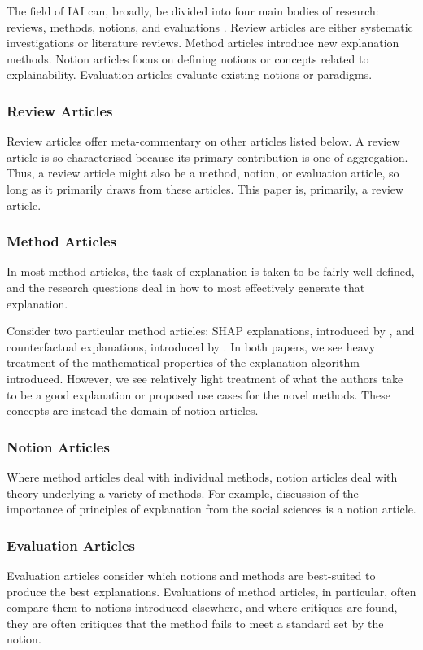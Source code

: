 The field of IAI can, broadly, be divided into four main bodies of research: reviews, methods, notions, and evaluations \cite{vilone_explainable_2020}. Review articles are either systematic investigations or literature reviews. Method articles introduce new explanation methods. Notion articles focus on defining notions or concepts related to explainability. Evaluation articles evaluate existing notions or paradigms.

\subsubsection{Review Articles}
Review articles offer meta-commentary on other articles listed below. A review article is so-characterised because its primary contribution is one of aggregation. Thus, a review article might also be a method, notion, or evaluation article, so long as it primarily draws from these articles. This paper is, primarily, a review article.

\subsubsection{Method Articles}
In most method articles, the task of explanation is taken to be fairly well-defined, and the research questions deal in how to most effectively generate that explanation. 

Consider two particular method articles: SHAP explanations, introduced by \textcite{lundberg_unified_2017}, and counterfactual explanations, introduced by \textcite{wachter_counterfactual_2017}. In both papers, we see heavy treatment of the mathematical properties of the explanation algorithm introduced. However, we see relatively light treatment of what the authors take to be a good explanation or proposed use cases for the novel methods. These concepts are instead the domain of notion articles.

\subsubsection{Notion Articles}
Where method articles deal with individual methods, notion articles deal with theory underlying a variety of methods. For example, \textcite{miller_explanation_2017} discussion of the importance of principles of explanation from the social sciences is a notion article.

\subsubsection{Evaluation Articles}
Evaluation articles consider which notions and methods are best-suited to produce the best explanations. Evaluations of method articles, in particular, often compare them to notions introduced elsewhere, and where critiques are found, they are often critiques that the method fails to meet a standard set by the notion.

